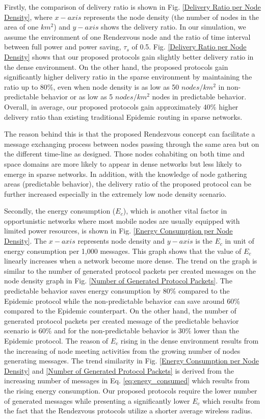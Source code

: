 Firstly, the comparison of delivery ratio is shown in Fig. \ref{Delivery Ratio per Node Density}, where $x-axis$ represents the node density (the number of nodes in the area of one $km^2$) and $y-axis$ shows the delivery ratio.
%
In our simulation, we assume the environment of one Rendezvous node and the ratio of time interval between full power and power saving, $\tau_s$ of 0.5.
%
Fig. \ref{Delivery Ratio per Node Density} shows that our proposed protocols gain slightly better delivery ratio in the dense environment.
%
On the other hand, the proposed protocols gain significantly higher delivery ratio in the sparse environment by maintaining the ratio up to 80\%, even when node density is as low as 50 $nodes/km^2$ in non-predictable behavior or as low as 5 $nodes/km^2$ nodes in predictable behavior.
%
Overall, in average, our proposed protocols gain approximately 40\% higher delivery ratio than existing traditional Epidemic routing in sparse networks.

The reason behind this is that the proposed Rendezvous concept can facilitate a message exchanging process between nodes passing through the same area but on the different time-line as designed.
Those nodes cohabiting on both time and space domains are more likely to appear in dense networks but less likely to emerge in sparse networks.
In addition, with the knowledge of node gathering areas (predictable behavior), the delivery ratio of the proposed protocol can be further increased especially in the extremely low node density scenario. 

Secondly, the energy consumption ($E_c$), which is another vital factor in opportunistic networks where most mobile nodes are usually equipped with limited power resources, is shown in Fig. \ref{Energy Consumption per Node Density}.
The $x-axis$ represents node density and $y-axis$ is the $E_c$ in unit of energy consumption per 1,000 messages.
This graph shows that the value of $E_c$ linearly increases when a network become more dense.
The trend on the graph is similar to the number of generated protocol packets per created messages on the node density graph in Fig. \ref{Number of Generated Protocol Packets}.
The predictable behavior saves energy consumption by 80\% compared to the Epidemic protocol while the non-predictable behavior can save around 60\% compared to the Epidemic counterpart.
On the other hand, the number of generated protocol packets per created message of the predictable behavior scenario is 60\% and for the non-predictable behavior is 30\% lower than the Epidemic protocol.
The reason of $E_c$ rising in the dense environment results from the increasing of node meeting activities from the growing number of nodes generating messages.
%
The trend similarity in Fig. \ref{Energy Consumption per Node Density} and \ref{Number of Generated Protocol Packets} is derived from the increasing number of messages in Eq. \ref{eq:enegy_consumed} which results from the rising energy consumption. 
Our proposed protocols require the lower number of generated messages while presenting a significantly lower $E_c$ which results from the fact that the Rendezvous protocols utilize a shorter average wireless radius.

